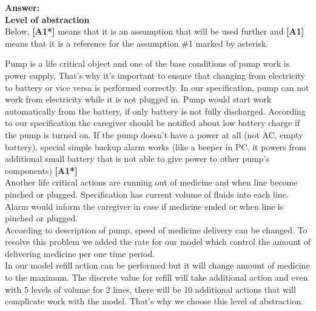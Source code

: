 \documentclass{article}
\begin{document}
\textbf{Answer:}\\

\textbf{Level of abstraction}\\
Below, \textbf{[A1*]} means that it is an assumption that will be used further and \textbf{[A1]} means that it is a reference for the assumption \#1 marked by asterisk.

Pump is a life critical object and one of the base conditions of pump work is power supply. That's why it's important to ensure that changing from electricity to battery or vice versa is performed correctly. In our specification, pump can not work from electricity while it is not plugged in. Pump would start work automatically from the battery, if only battery is not fully discharged. According to our specification the caregiver should be notified about low battery charge if the pump is turned on. If the pump doesn’t have a power at all (not AC, empty battery), special simple backup alarm works (like a beeper in PC, it powers from additional small battery that is not able to give power to other pump’s components) \textbf{[A1*]}\\
Another life critical actions are running out of medicine and when line become pinched or plugged. Specification has current volume of fluids into each line. Alarm would inform the caregiver in case if medicine ended or when line is pinched or plugged. \\
According to description of pump, speed of medicine delivery can be changed. To resolve this problem we added the rate for our model which control the amount of delivering medicine per one time period. \\
In our model refill action can be performed but it will change amount of medicine to the maximum. The discrete value for refill will take additional action and even with 5 levels of volume for 2 lines, there will be 10 additional actions that will complicate work with the model. That's why we choose this level of abstraction. \\
\end{document}
